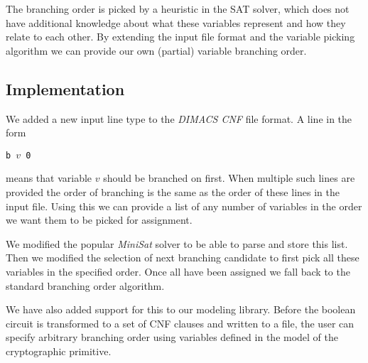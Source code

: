 The branching order is picked by a heuristic in the SAT solver, which does not have additional knowledge about what these variables represent and how they relate to each other.
By extending the input file format and the variable picking algorithm we can provide our own (partial) variable branching order.

\subsection{Implementation}
\label{sec:branching-order-impl}
We added a new input line type to the \emph{DIMACS CNF} file format.
A line in the form

\centerline{\texttt{b $v$ 0}}

\noindent means that variable $v$ should be branched on first.
When multiple such lines are provided the order of branching is the same as the order of these lines in the input file.
Using this we can provide a list of any number of variables in the order we want them to be picked for assignment.

We modified the popular \emph{MiniSat} solver \cite{een2005minisat} to be able to parse and store this list.
Then we modified the selection of next branching candidate to first pick all these variables in the specified order.
Once all have been assigned we fall back to the standard branching order algorithm.

We have also added support for this to our modeling library.
Before the boolean circuit is transformed to a set of CNF clauses and written to a file, the user can specify arbitrary branching order using variables defined in the model of the cryptographic primitive.